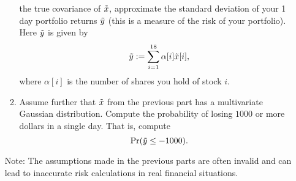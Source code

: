 \documentclass[12pt,twoside]{article}
\begin{document}
\begin{enumerate}
\begin{enumerate}
    the true covariance of $\tilde{  x }$, approximate the standard deviation of
    your 1 day portfolio returns $\tilde{  y }$ (this is a measure of the risk of your
    portfolio).  Here $\tilde{  y }$ is given by
    $$\tilde{  y } := \sum_{i=1}^{18} \alpha[i] \tilde{  x }[i],$$
    where $\alpha[i]$ is the number of shares you hold of stock $i$.  
  \item Assume further that $\tilde{  x }$ from the previous part has a
    multivariate Gaussian distribution.  Compute the probability
    of losing $1000$ or more dollars in a single day.  That is,
    compute
    $$\Pr(\tilde{  y } \leq -1000).$$
  \end{enumerate}
  Note: The assumptions made in the previous parts are often
  invalid and can lead to inaccurate risk calculations in real
  financial situations. 

\end{enumerate}
\end{document}
